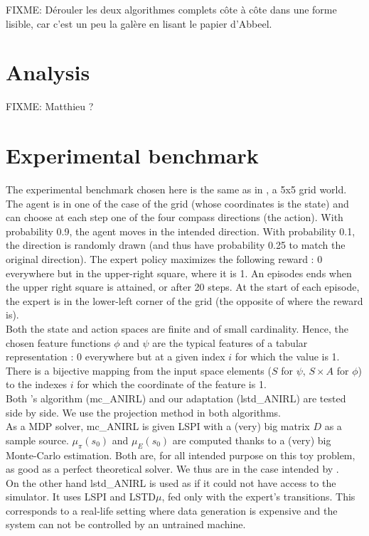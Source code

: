 \documentclass{article}
\begin{document}
FIXME: Dérouler les deux algorithmes complets côte à côte dans une forme lisible, car c'est un peu la galère en lisant le papier d'Abbeel.
\section{Analysis}
FIXME: Matthieu ?
\section{Experimental benchmark}
The experimental benchmark chosen here is the same as in \citep{ng2000algorithms}, a 5x5 grid world. The agent is in one of the case of the grid (whose coordinates is the state) and can choose at each step one of the four compass directions (the action). With probability 0.9, the agent moves in the intended direction. With probability 0.1, the direction is randomly drawn (and thus have probability 0.25 to match the original direction). The expert policy maximizes the following reward : 0 everywhere but in the upper-right square, where it is 1. An episodes ends when the upper right square is attained, or after 20 steps. At the start of each episode, the expert is in the lower-left corner of the grid (the opposite of where the reward is).\\

Both the state and action spaces are finite and of small cardinality. Hence, the chosen feature functions $\phi$ and $\psi$ are the typical features of a tabular representation : 0 everywhere but at a given index $i$ for which the value is 1. There is a bijective mapping from the input space elements ($S$ for $\psi$, $S \times A$ for $\phi$) to the indexes $i$ for which the coordinate of the feature is 1.\\

Both \citet{abbeel2004apprenticeship}'s algorithm (mc\_ANIRL) and our adaptation (lstd\_ANIRL) are tested side by side. We use the projection method in both algorithms.\\

As a MDP solver, mc\_ANIRL is given LSPI with a (very) big matrix $D$ as a sample source. $\mu_\pi(s_0)$ and $\mu_E(s_0)$ are computed thanks to a (very) big Monte-Carlo estimation. Both are, for all intended purpose on this toy problem, as good as a perfect theoretical solver. We thus are in the case intended by \citet{abbeel2004apprenticeship}.\\

On the other hand lstd\_ANIRL is used as if it could not have access to the simulator. It uses LSPI and LSTD$\mu$, fed only with the expert's transitions. This corresponds to a real-life setting where data generation is expensive and the system can not be controlled by an untrained machine.\\
\end{document}
